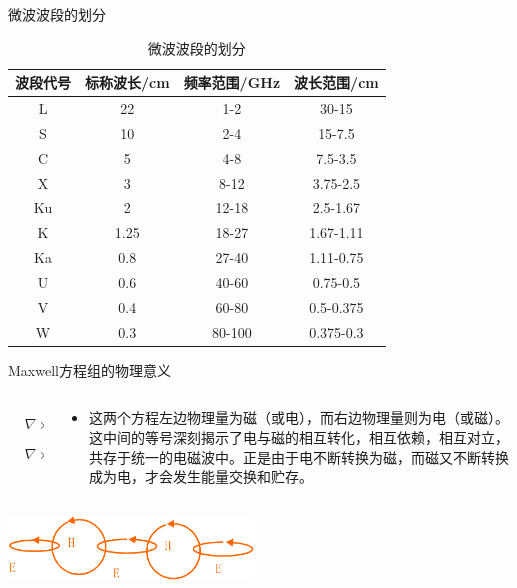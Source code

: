 \begin{frame}{微波波段的划分}
  \begin{table}
    \caption{微波波段的划分}
    \begin{tabular}{cccc}
      \toprule
      波段代号 & 标称波长/cm & 频率范围/GHz & 波长范围/cm   \\
      \midrule
      L    & 22      & 1-2      & 30-15     \\
      S    & 10      & 2-4      & 15-7.5    \\
      C    & 5       & 4-8      & 7.5-3.5   \\
      X    & 3       & 8-12     & 3.75-2.5  \\
      Ku   & 2       & 12-18    & 2.5-1.67  \\
      K    & 1.25    & 18-27    & 1.67-1.11 \\
      Ka   & 0.8     & 27-40    & 1.11-0.75 \\
      U    & 0.6     & 40-60    & 0.75-0.5  \\
      V    & 0.4     & 60-80    & 0.5-0.375 \\
      W    & 0.3     & 80-100   & 0.375-0.3 \\
      \bottomrule
    \end{tabular}
  \end{table}

\end{frame}

\begin{frame}{Maxwell方程组的物理意义}
  \begin{columns}
    \begin{column}{0.4\linewidth}
      \begin{align*}
         & \nabla\times\vec{E} = -\frac{\partial \vec{B}}{\partial t}        \\
         & \nabla\times\vec{H} = \vec{J}+\frac{\partial \vec{D}}{\partial t}
      \end{align*}
    \end{column}
    \begin{column}{0.6\linewidth}
      \begin{itemize}
        \item 这两个方程左边物理量为磁（或电），而右边物理量则为电（或磁）。这中间的等号深刻揭示了电与磁的相互转化，相互依赖，相互对立，共存于统一的电磁波中。正是由于电不断转换为磁，而磁又不断转换成为电，才会发生能量交换和贮存。
      \end{itemize}
    \end{column}
  \end{columns}
  \centering
  \includegraphics[width=6.5cm]{Cha1//ehconvert.png}
\end{frame}

